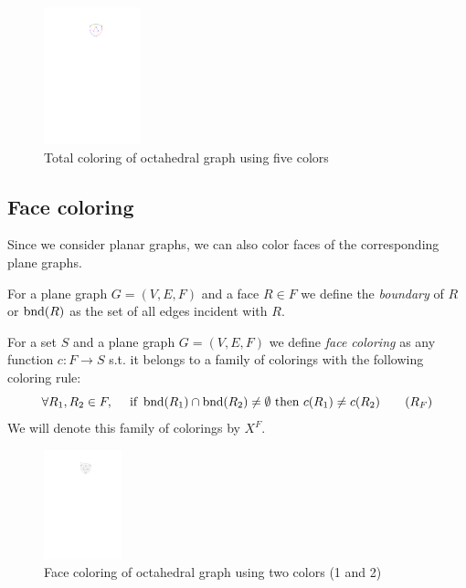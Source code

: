 \begin{figure}[H]
    \centering
    \includegraphics[width=0.25\textwidth]{../Resources/Figs/octahedral_tot_colr.pdf}
    \caption{Total coloring of octahedral graph using five colors}
    \label{fig:octahedral_tot_coloring}
\end{figure}

\subsection{Face coloring}

Since we consider planar graphs, we can also color faces of the corresponding plane graphs.

\begin{defn}[boundary]
    For a plane graph $G=(V,E,F)$ and a face $R \in F$ we define the \emph{boundary} of $R$ or $\operatorname{bnd}(R)$ as the set of all edges incident with $R$.
\end{defn}

\begin{defn}
    For a set $S$ and a plane graph $G=(V,E,F)$ we define \emph{face coloring} as any function $c: F \rightarrow S$ s.t. it belongs to a family of colorings with the following coloring rule:
    \begin{equation}\label{eqn:face_rule}
     \forall R_1,R_2 \in F, \quad \text{ if } \operatorname{bnd}(R_1) \cap \operatorname{bnd}(R_2) \neq \emptyset \text{ then } c(R_1) \neq c(R_2) \tag{$R_F$}
    \end{equation}
    We will denote this family of colorings by $X^F$.
\end{defn}

\begin{figure}[H]
    \centering
    \includegraphics[width=0.2\textwidth]{../Resources/Figs/octahedral_face_colr.pdf}
    \caption{Face coloring of octahedral graph using two colors (1 and 2)}
    \label{fig:face_tot_coloring}
\end{figure}

